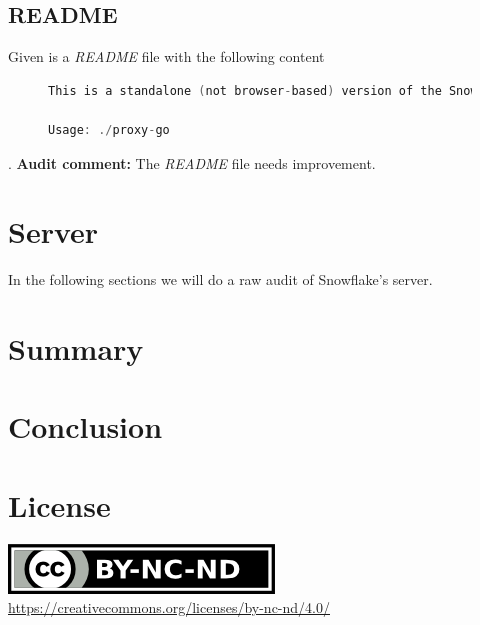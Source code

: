 \documentclass{amsart}
\theoremstyle{definition}
\theoremstyle{remark}
\numberwithin{equation}{section}
\begin{document}
\subsection{README}
\label{ss:proxygoreadme}
Given is a \textit{README} file \cite{SnowflakeGitProxyGo} with the following content

\begin{figure}[H]
\begin{lstlisting}[frame=single, language=C, caption=proxy-go README]
This is a standalone (not browser-based) version of the Snowflake proxy.

Usage: ./proxy-go
\end{lstlisting}
\label{fig:proxygoreadme}
\end{figure}
. \textbf{Audit comment:} The \textit{README} file needs improvement.
\section{Server}
\label{s:server}
In the following sections we will do a raw audit of Snowflake's server.
\section{Summary}
\label{s:summary}
\section{Conclusion}
\label{s:conclusion}
\nocite{*}
%


\section*{License}
\label{s:license}
\begin{center}
	\includegraphics{by-nc-nd.png} \\
	\url{https://creativecommons.org/licenses/by-nc-nd/4.0/}
\end{center}
\end{document}
